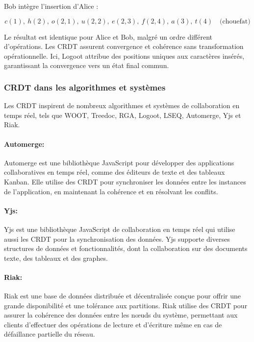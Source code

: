 Bob intègre l'insertion d'Alice :

\begin{equation}
    c(1), \ h(2), \ o(2, 1), \ u(2, 2), \ e(2, 3), \ f(2, 4), \ a(3), \ t(4) \quad \text{(chouefat)}
\end{equation}

Le résultat est identique pour Alice et Bob, malgré un ordre différent d'opérations. Les CRDT assurent convergence et cohérence sans transformation opérationnelle. Ici, Logoot attribue des positions uniques aux caractères insérés, garantissant la convergence vers un état final commun.
\subsubsection{CRDT dans les algorithmes et systèmes}
Les CRDT inspirent de nombreux algorithmes et systèmes de collaboration en temps réel, tels que WOOT, Treedoc, RGA, Logoot, LSEQ, Automerge, Yjs et Riak.

\paragraph{Automerge: } Automerge est une bibliothèque JavaScript pour développer des applications collaboratives en temps réel, comme des éditeurs de texte et des tableaux Kanban. Elle utilise des CRDT pour synchroniser les données entre les instances de l'application, en maintenant la cohérence et en résolvant les conflits.

\paragraph{Yjs: } Yjs est une bibliothèque JavaScript de collaboration en temps réel qui utilise aussi les CRDT pour la synchronisation des données. Yjs supporte diverses structures de données et fonctionnalités, dont la collaboration sur des documents texte, des tableaux et des graphes.

\paragraph{Riak: } Riak est une base de données distribuée et décentralisée conçue pour offrir une grande disponibilité et une tolérance aux partitions. Riak utilise des CRDT pour assurer la cohérence des données entre les nœuds du système, permettant aux clients d'effectuer des opérations de lecture et d'écriture même en cas de défaillance partielle du réseau.

